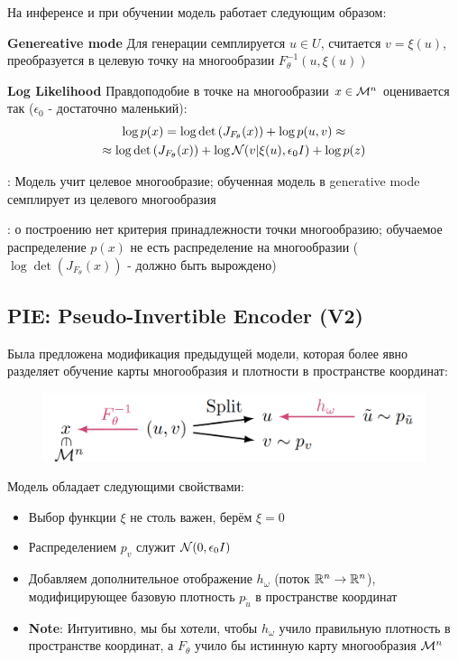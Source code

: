 На инференсе и при обучении модель работает следующим образом: 

\textbf{Genereative mode}
Для генерации семплируется $u \in U$, считается $v = \xi(u)$, преобразуется в целевую точку на многообразии $F_{\theta}^{-1}(u, \xi(u))$

\textbf{Log Likelihood}
Правдоподобие в точке на многообразии $x \in \mathcal{M}^n$ оценивается так ($\epsilon_0$ - достаточно маленький): 
\vspace{-2mm}
\begin{gather*}
    \log p(x) = \log \det \left(J_{F_{\theta}}(x)\right) + \log p(u, v) \approx \\
    \approx \log \det \left(J_{F_{\theta}}(x)\right) + \log \mathcal{N}(v | \xi(u), \epsilon_0 I) + \log p(z)
\end{gather*}

: Модель учит целевое многообразие; обученная модель в generative mode семплирует из целевого многообразия

: о построению нет критерия принадлежности точки многообразию; обучаемое распределение $p(x)$ не есть распределение на многообразии ($\log \det (J_{F_{\theta}}(x))$ - должно быть вырождено)

\newpage

\subsection{PIE: Pseudo-Invertible Encoder (V2)}

Была предложена модификация предыдущей модели, которая более явно разделяет обучение карты многообразия и плотности в пространстве координат: 

\begin{figure}[h]
    \centering
    \includegraphics[width=0.6\linewidth]{chapters/petr_mokrov_s1/figs/pie_v2_final.png}
\end{figure}

Модель обладает следующими свойствами: 
\begin{itemize}
    \item Выбор функции $\xi$ не столь важен, берём $\xi = 0$
    \item Распределением $p_v$ служит $\mathcal{N}(0, \epsilon_0 I)$
    \item Добавляем дополнительное отображение $h_{\omega}$ (поток $\mathbb{R}^n \rightarrow \mathbb{R}^n$), модифицирующее базовую плотность $p_{\tilde{u}}$ в пространстве координат
    \item \textbf{Note}: Интуитивно, мы бы хотели, чтобы $h_{\omega}$ учило правильную плотность в пространстве координат, а $F_{\theta}$ учило бы истинную карту многообразия $\mathcal{M}^n$ 
\end{itemize}

